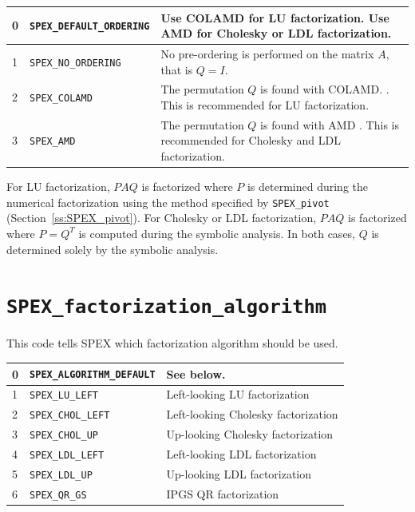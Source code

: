 \documentclass[12pt,oneside]{book}
\theoremstyle{definition}
\newenvironment{SizedCenteredTabular}[2][\small]
    {   
        #1\begin{center}\begin{tabular}{#2}
    }{ 
        \end{tabular}\end{center}
    }
\begin{document}
\begin{SizedCenteredTabular}{llp{4in}} \hline
    0 & \verb'SPEX_DEFAULT_ORDERING' & Use COLAMD for LU factorization.
        Use AMD for Cholesky or LDL factorization. \\ \hline
    1 & \verb|SPEX_NO_ORDERING| & No pre-ordering is performed on the matrix $A$,
                                  that is $Q = I$. \\ \hline
    2 & \verb|SPEX_COLAMD|      & The permutation $Q$ is found with COLAMD.
                                  \cite{davis2004algorithmcolamd}.
                                  This is recommended for LU factorization.
                                  \\ \hline
    3 & \verb|SPEX_AMD|         & The permutation $Q$ is found with AMD
                                 \cite{amestoy2004algorithmamd}.
                                 This is recommended for Cholesky and LDL factorization.
                                 \\ \hline
\end{SizedCenteredTabular}

For LU factorization, $PAQ$ is factorized where $P$ is determined during the
numerical factorization using the method specified by \verb'SPEX_pivot' 
(Section~\ref{ss:SPEX_pivot}).
For Cholesky or LDL factorization, $PAQ$ is factorized
where $P=Q^T$ is computed during the symbolic analysis.
In both cases, $Q$ is determined solely by the symbolic analysis.

\section{\texttt{SPEX\_factorization\_algorithm}} \label{ss:SPEX_factorization_algorithm}
This code tells SPEX which factorization algorithm should be used.

\begin{SizedCenteredTabular}{llp{4in}} \hline
    0 & \verb'SPEX_ALGORITHM_DEFAULT' & See below. \\ \hline
    1 & \verb|SPEX_LU_LEFT|      & Left-looking LU factorization \\ \hline
    2 & \verb|SPEX_CHOL_LEFT|    & Left-looking Cholesky factorization\\ \hline
    3 & \verb|SPEX_CHOL_UP|      & Up-looking Cholesky factorization \\ \hline
    4 & \verb|SPEX_LDL_LEFT|     & Left-looking LDL factorization \\ \hline
    5 & \verb|SPEX_LDL_UP|       & Up-looking LDL factorization \\ \hline
    6 & \verb|SPEX_QR_GS|        & IPGS QR factorization \\ \hline
\end{SizedCenteredTabular}
\end{document}
